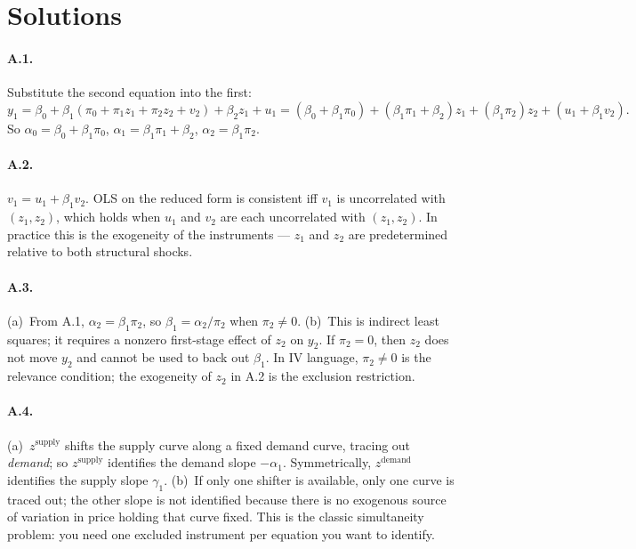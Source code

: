 \documentclass{article}
\begin{document}
\begin{enumerate}[label=\textbf{C.\arabic*},leftmargin=*,itemsep=10pt]
\end{enumerate}

\newpage

\section*{Solutions}

\paragraph{A.1.}  Substitute the second equation into the first:
$$y_1 = \beta_0 + \beta_1(\pi_0 + \pi_1 z_1 + \pi_2 z_2 + v_2) + \beta_2 z_1 + u_1 = (\beta_0 + \beta_1\pi_0) + (\beta_1\pi_1 + \beta_2)z_1 + (\beta_1\pi_2)z_2 + (u_1 + \beta_1 v_2).$$
So $\alpha_0 = \beta_0 + \beta_1\pi_0$, $\alpha_1 = \beta_1\pi_1 + \beta_2$, $\alpha_2 = \beta_1\pi_2$.

\paragraph{A.2.}  $v_1 = u_1 + \beta_1 v_2$.  OLS on the reduced form is consistent iff $v_1$ is uncorrelated with $(z_1, z_2)$, which holds when $u_1$ and $v_2$ are each uncorrelated with $(z_1, z_2)$.  In practice this is the exogeneity of the instruments --- $z_1$ and $z_2$ are predetermined relative to both structural shocks.

\paragraph{A.3.}  (a)~From A.1, $\alpha_2 = \beta_1\pi_2$, so $\beta_1 = \alpha_2/\pi_2$ when $\pi_2 \neq 0$.  (b)~This is indirect least squares; it requires a nonzero first-stage effect of $z_2$ on $y_2$.  If $\pi_2 = 0$, then $z_2$ does not move $y_2$ and cannot be used to back out $\beta_1$.  In IV language, $\pi_2 \neq 0$ is the relevance condition; the exogeneity of $z_2$ in A.2 is the exclusion restriction.

\paragraph{A.4.}  (a)~$z^{\text{supply}}$ shifts the supply curve along a fixed demand curve, tracing out \emph{demand}; so $z^{\text{supply}}$ identifies the demand slope $-\alpha_1$.  Symmetrically, $z^{\text{demand}}$ identifies the supply slope $\gamma_1$.  (b)~If only one shifter is available, only one curve is traced out; the other slope is not identified because there is no exogenous source of variation in price holding that curve fixed.  This is the classic simultaneity problem: you need one excluded instrument per equation you want to identify.
\end{document}
